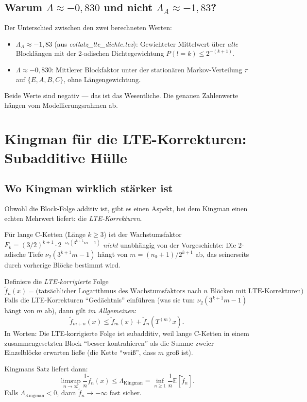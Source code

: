 \documentclass[12pt,a4paper]{article}
\newcommand{\vii}{\nu_2}
\begin{document}
\subsection{Warum $\Lambda \approx -0{,}830$ und nicht $\Lambda_A \approx -1{,}83$?}

Der Unterschied zwischen den zwei berechneten Werten:
\begin{itemize}
  \item $\Lambda_A \approx -1{,}83$ (aus \textit{collatz\_lte\_dichte.tex}):
    Gewichteter Mittelwert über \emph{alle} Blocklängen mit der 2-adischen
    Dichtegewichtung $P(l=k) \leq 2^{-(k+1)}$.
  \item $\Lambda \approx -0{,}830$: Mittlerer Blockfaktor unter der
    stationären Markov-Verteilung $\pi$ auf $\{E,A,B,C\}$, ohne
    Längengewichtung.
\end{itemize}
Beide Werte sind negativ --- das ist das Wesentliche. Die genauen Zahlenwerte
hängen vom Modellierungsrahmen ab.

\section{Kingman für die LTE-Korrekturen: Subadditive Hülle}
\label{sec:kingman-lte}

\subsection{Wo Kingman wirklich stärker ist}

Obwohl die Block-Folge additiv ist, gibt es einen Aspekt, bei dem Kingman
einen echten Mehrwert liefert: die \emph{LTE-Korrekturen}.

Für lange C-Ketten (Länge $k \geq 3$) ist der Wachstumsfaktor
$F_k = (3/2)^{k+1} \cdot 2^{-\vii(3^{k+1}m-1)}$ \emph{nicht} unabhängig
von der Vorgeschichte: Die 2-adische Tiefe $\vii(3^{k+1}m-1)$ hängt von
$m = (n_0+1)/2^{k+1}$ ab, das seinerseits durch vorherige Blöcke bestimmt wird.

\begin{tcolorbox}[kingman, title={Subadditive Hülle der LTE-korrigierten Folge}]
Definiere die \emph{LTE-korrigierte} Folge
\[
  \tilde{f}_n(x) = \text{(tatsächlicher Logarithmus des Wachstumsfaktors
  nach $n$ Blöcken mit LTE-Korrekturen)}.
\]
Falls die LTE-Korrekturen ``Gedächtnis'' einführen (was sie tun:
$\vii(3^{k+1}m-1)$ hängt von $m$ ab), dann gilt \emph{im Allgemeinen}:
\[
  \tilde{f}_{m+n}(x) \leq \tilde{f}_m(x) + \tilde{f}_n(T^{(m)}x).
\]
In Worten: Die LTE-korrigierte Folge ist subadditiv, weil lange C-Ketten
in einem zusammengesetzten Block ``besser kontrahieren'' als die Summe
zweier Einzelblöcke erwarten ließe (die Kette ``weiß'', dass $m$ groß ist).

\medskip
Kingmans Satz liefert dann:
\[
  \limsup_{n\to\infty}\frac{1}{n}\tilde{f}_n(x)
  \leq \Lambda_{\mathrm{Kingman}}
  = \inf_{n\geq 1}\frac{1}{n}\mathbb{E}[\tilde{f}_n].
\]
Falls $\Lambda_{\mathrm{Kingman}} < 0$, dann $\tilde{f}_n \to -\infty$ fast sicher.
\end{tcolorbox}
\end{document}

